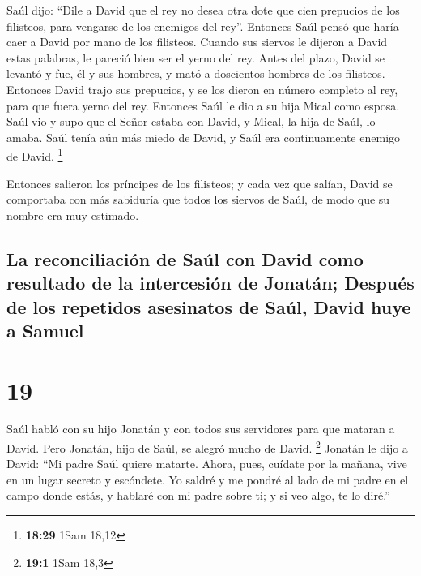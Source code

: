  Saúl dijo: ``Dile a David que el rey no desea otra dote
que cien prepucios de los filisteos, para vengarse de los enemigos del
rey''. Entonces Saúl pensó que haría caer a David por mano de los
filisteos.  Cuando sus siervos le dijeron a David estas
palabras, le pareció bien ser el yerno del rey. Antes del plazo,
 David se levantó y fue, él y sus hombres, y mató a
doscientos hombres de los filisteos. Entonces David trajo sus prepucios,
y se los dieron en número completo al rey, para que fuera yerno del rey.
Entonces Saúl le dio a su hija Mical como esposa.  Saúl
vio y supo que el Señor estaba con David, y Mical, la hija de Saúl, lo
amaba.  Saúl tenía aún más miedo de David, y Saúl era
continuamente enemigo de David. \footnote{\textbf{18:29} 1Sam 18,12}

 Entonces salieron los príncipes de los filisteos; y cada
vez que salían, David se comportaba con más sabiduría que todos los
siervos de Saúl, de modo que su nombre era muy estimado.

\hypertarget{la-reconciliaciuxf3n-de-sauxfal-con-david-como-resultado-de-la-intercesiuxf3n-de-jonatuxe1n-despuuxe9s-de-los-repetidos-asesinatos-de-sauxfal-david-huye-a-samuel}{%
\subsection{La reconciliación de Saúl con David como resultado de la
intercesión de Jonatán; Después de los repetidos asesinatos de Saúl,
David huye a
Samuel}\label{la-reconciliaciuxf3n-de-sauxfal-con-david-como-resultado-de-la-intercesiuxf3n-de-jonatuxe1n-despuuxe9s-de-los-repetidos-asesinatos-de-sauxfal-david-huye-a-samuel}}

\hypertarget{section-18}{%
\section{19}\label{section-18}}

 Saúl habló con su hijo Jonatán y con todos sus servidores
para que mataran a David. Pero Jonatán, hijo de Saúl, se alegró mucho de
David. \footnote{\textbf{19:1} 1Sam 18,3}  Jonatán le dijo
a David: ``Mi padre Saúl quiere matarte. Ahora, pues, cuídate por la
mañana, vive en un lugar secreto y escóndete.  Yo saldré y
me pondré al lado de mi padre en el campo donde estás, y hablaré con mi
padre sobre ti; y si veo algo, te lo diré.''


